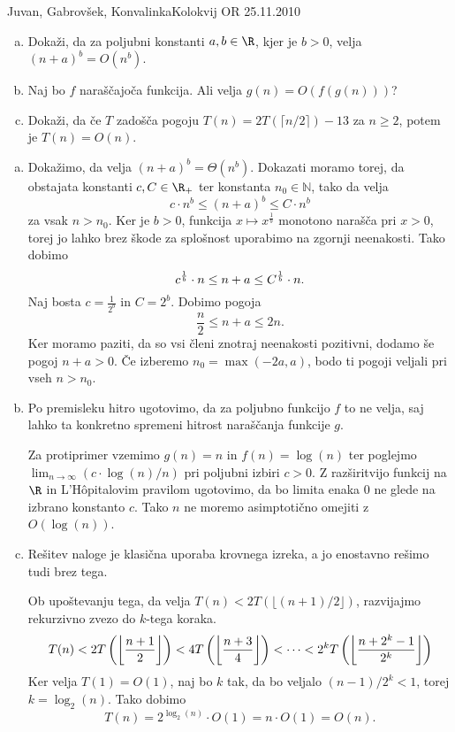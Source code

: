 \begin{naloga}{Juvan, Gabrovšek, Konvalinka}{Kolokvij OR 25.11.2010}
\begin{vprasanje}
\begin{enumerate}[(a)]
\item Dokaži, da za poljubni konstanti $a, b \in \R$, kjer je $b > 0$,
velja ${(n + a)}^b = O(n^b)$.

\item Naj bo $f$ naraščajoča funkcija.
Ali velja $g(n) = O(f(g(n)))$?

\item Dokaži,
da če $T$ zadošča pogoju $T(n) = 2T(\lceil n/2 \rceil) - 13$ za $n \ge 2$,
potem je $T(n) = O(n)$.
\end{enumerate}
\end{vprasanje}

\begin{odgovor}
\begin{enumerate}[(a)]
\item Dokažimo, da velja $(n + a)^b = \Theta(n^b)$.
Dokazati moramo torej,
da obstajata konstanti $c, C \in \R_+$ ter konstanta $n_0 \in \mathbb{N}$,
tako da velja
$$
c \cdot n^b \leq (n + a)^b \leq C \cdot n^b
$$
za vsak $n > n_0$.
Ker je $b > 0$,
funkcija $x \mapsto x^{\frac{1}{b}}$ monotono narašča pri $x>0$,
torej jo lahko brez škode za splošnost uporabimo na zgornji neenakosti.
Tako dobimo
$$
c^{1 \over b} \cdot n \leq n + a \leq C^{1 \over b} \cdot n.
$$
Naj bosta $c = \frac{1}{2^b}$ in $C = 2^b$.
Dobimo pogoja
$$
\frac{n}{2} \leq n + a \leq 2n .
$$
Ker moramo paziti, da so vsi členi znotraj neenakosti pozitivni,
dodamo še pogoj $n + a > 0$.
Če izberemo $n_0 = \max(-2a, a)$,
bodo ti pogoji veljali pri vseh $n > n_0$.

\item Po premisleku hitro ugotovimo, da za poljubno funkcijo $f$ to ne velja,
saj lahko ta konkretno spremeni hitrost naraščanja funkcije $g$.

Za protiprimer vzemimo $g(n) = n$ in $f(n) = \log(n)$
ter poglejmo $\lim_{n \rightarrow \infty} (c \cdot \log(n) / n)$
pri poljubni izbiri $c > 0$.
Z razširitvijo funkcij na $\R$ in L'Hôpitalovim pravilom ugotovimo,
da bo limita enaka $0$ ne glede na izbrano konstanto $c$.
Tako $n$ ne moremo asimptotično omejiti z $O(\log(n))$.

\item Rešitev naloge je klasična uporaba krovnega izreka,
a jo enostavno rešimo tudi brez tega.

Ob upoštevanju tega, da velja $T(n) < 2T(\lfloor (n+1)/2 \rfloor)$,
razvijajmo rekurzivno zvezo do $k$-tega koraka.
$$
T(n) < 2T\left(\left\lfloor{n+1 \over 2}\right\rfloor\right)
< 4T\left(\left\lfloor{n+3 \over 4}\right\rfloor\right)
< \dots < 2^k T\left(\left\lfloor{n + 2^k - 1 \over 2^k}\right\rfloor\right)
$$
Ker velja $T(1) = O(1)$, naj bo $k$ tak,
da bo veljalo $(n-1) / 2^k < 1$, torej $k = \log_2(n)$.
Tako dobimo
$$
T(n) = 2^{\log_2(n)} \cdot O(1) = n \cdot O(1) = O(n).
$$
\end{enumerate}
\end{odgovor}
\end{naloga}
